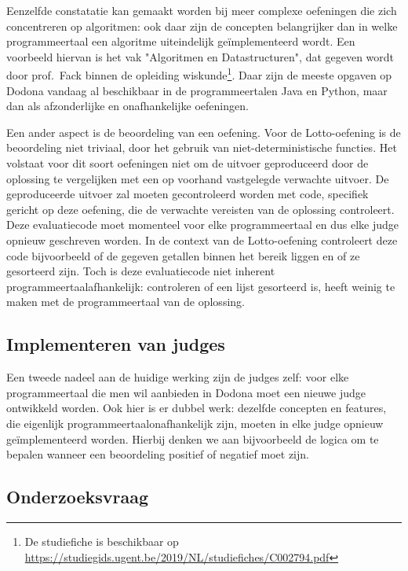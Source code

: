 Eenzelfde constatatie kan gemaakt worden bij meer complexe oefeningen die zich concentreren op algoritmen: ook daar zijn de concepten belangrijker dan in welke programmeertaal een algoritme uiteindelijk geïmplementeerd wordt.
Een voorbeeld hiervan is het vak "Algoritmen en Datastructuren", dat gegeven wordt door prof.\ Fack binnen de opleiding wiskunde\footnote{De studiefiche is beschikbaar op \url{https://studiegids.ugent.be/2019/NL/studiefiches/C002794.pdf}}.
Daar zijn de meeste opgaven op Dodona vandaag al beschikbaar in de programmeertalen Java en Python, maar dan als afzonderlijke en onafhankelijke oefeningen.

Een ander aspect is de beoordeling van een oefening.
Voor de Lotto-oefening is de beoordeling niet triviaal, door het gebruik van niet-deterministische functies.
Het volstaat voor dit soort oefeningen niet om de uitvoer geproduceerd door de oplossing te vergelijken met een op voorhand vastgelegde verwachte uitvoer.
De geproduceerde uitvoer zal moeten gecontroleerd worden met code, specifiek gericht op deze oefening, die de verwachte vereisten van de oplossing controleert.
Deze evaluatiecode moet momenteel voor elke programmeertaal en dus elke judge opnieuw geschreven worden.
In de context van de Lotto-oefening controleert deze code bijvoorbeeld of de gegeven getallen binnen het bereik liggen en of ze gesorteerd zijn.
Toch is deze evaluatiecode niet inherent programmeertaalafhankelijk: controleren of een lijst gesorteerd is, heeft weinig te maken met de programmeertaal van de oplossing.

\subsection*{Implementeren van judges}\label{subsec:implementeren-van-judges}

Een tweede nadeel aan de huidige werking zijn de judges zelf: voor elke programmeertaal die men wil aanbieden in Dodona moet een nieuwe judge ontwikkeld worden.
Ook hier is er dubbel werk: dezelfde concepten en features, die eigenlijk programmeertaalonafhankelijk zijn, moeten in elke judge opnieuw geïmplementeerd worden.
Hierbij denken we aan bijvoorbeeld de logica om te bepalen wanneer een beoordeling positief of negatief moet zijn.

\subsection*{Onderzoeksvraag}\label{subsec:onderzoeksvraag}

